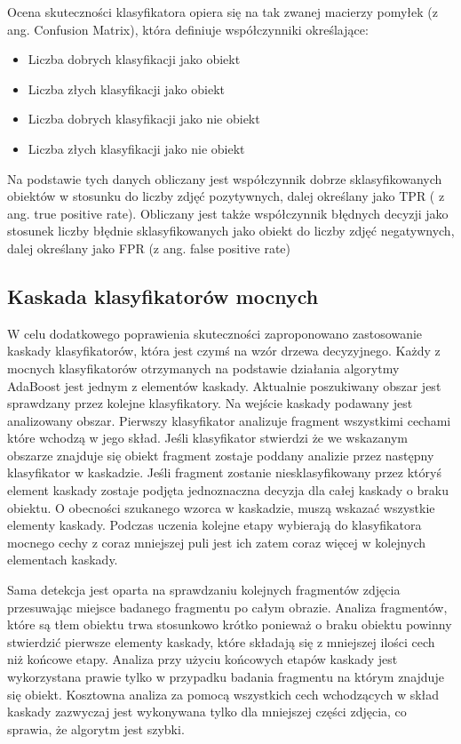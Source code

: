 Ocena skuteczności klasyfikatora opiera się na tak zwanej macierzy pomyłek (z ang. Confusion Matrix), która definiuje współczynniki określające:
\begin{itemize}
	\item Liczba dobrych klasyfikacji jako obiekt
	\item Liczba złych klasyfikacji jako obiekt
	\item Liczba dobrych klasyfikacji jako nie obiekt
	\item Liczba złych klasyfikacji jako nie obiekt
\end{itemize}

Na podstawie tych danych obliczany jest współczynnik dobrze sklasyfikowanych obiektów w stosunku do liczby zdjęć pozytywnych, dalej określany jako TPR ( z ang. true positive rate). Obliczany jest także współczynnik błędnych decyzji jako stosunek liczby błędnie sklasyfikowanych jako obiekt do liczby zdjęć negatywnych, dalej określany jako FPR (z ang. false positive rate)

\subsection{Kaskada klasyfikatorów mocnych}
W celu dodatkowego poprawienia skuteczności zaproponowano zastosowanie kaskady klasyfikatorów, która jest czymś na wzór drzewa decyzyjnego. Każdy z mocnych klasyfikatorów otrzymanych na podstawie działania algorytmy AdaBoost jest jednym z elementów kaskady. Aktualnie poszukiwany obszar jest sprawdzany przez kolejne klasyfikatory. Na wejście kaskady podawany jest analizowany obszar. Pierwszy klasyfikator analizuje fragment wszystkimi cechami które wchodzą w jego skład. Jeśli klasyfikator stwierdzi że we wskazanym obszarze znajduje się obiekt fragment zostaje poddany analizie przez następny klasyfikator w kaskadzie. Jeśli fragment zostanie niesklasyfikowany przez któryś element kaskady zostaje podjęta jednoznaczna decyzja dla całej kaskady o braku obiektu. O obecności szukanego wzorca w kaskadzie, muszą wskazać wszystkie elementy kaskady. Podczas uczenia kolejne etapy wybierają do klasyfikatora mocnego cechy z coraz mniejszej puli jest ich zatem coraz więcej w kolejnych elementach kaskady. 

Sama detekcja jest oparta na sprawdzaniu kolejnych fragmentów zdjęcia przesuwając miejsce badanego fragmentu po całym obrazie. Analiza fragmentów, które są tłem obiektu trwa stosunkowo krótko ponieważ o braku obiektu powinny stwierdzić pierwsze elementy kaskady, które składają się z mniejszej ilości cech niż końcowe etapy. Analiza przy użyciu końcowych etapów kaskady jest wykorzystana prawie tylko w przypadku badania fragmentu na którym znajduje się obiekt.
Kosztowna analiza za pomocą wszystkich cech wchodzących w skład kaskady zazwyczaj jest wykonywana tylko dla mniejszej części zdjęcia, co sprawia, że algorytm jest szybki.
